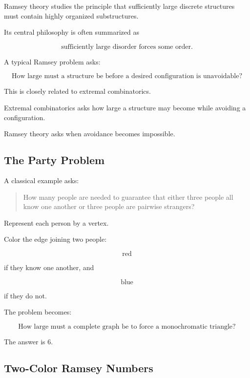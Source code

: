 Ramsey theory studies the principle that sufficiently large discrete
structures must contain highly organized substructures.

Its central philosophy is often summarized as

\[
\boxed{
\text{sufficiently large disorder forces some order}.
}
\]

A typical Ramsey problem asks:

\[
\boxed{
\text{How large must a structure be before a desired configuration is
unavoidable?}
}
\]

This is closely related to extremal combinatorics.

Extremal combinatorics asks how large a structure may become while
avoiding a configuration.

Ramsey theory asks when avoidance becomes impossible.

\subsection{The Party Problem}
\label{subsec:party-problem}

A classical example asks:

\begin{quote}
How many people are needed to guarantee that either three people all
know one another or three people are pairwise strangers?
\end{quote}

Represent each person by a vertex.

Color the edge joining two people:

\[
\text{red}
\]

if they know one another, and

\[
\text{blue}
\]

if they do not.

The problem becomes:

\[
\boxed{
\text{How large must a complete graph be to force a monochromatic
triangle?}
}
\]

The answer is \(6\).

\subsection{Two-Color Ramsey Numbers}
\label{subsec:two-color-ramsey-numbers}

